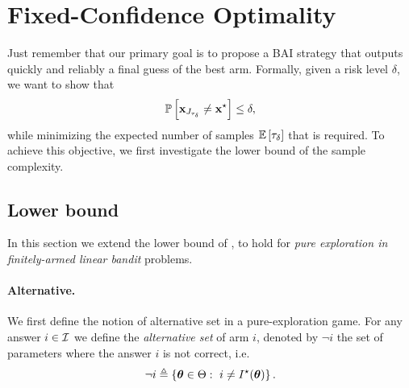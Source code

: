 \section{Fixed-Confidence Optimality}\label{sec:lgc.complexity}

Just remember that our primary goal is to propose a BAI strategy that outputs quickly and reliably a final guess of the best arm. Formally, given a risk level $\delta$, we want to show that
\[
  \mathbb{P}\left[{\bf x}_{J_{\tau_\delta}}\neq {\bf x}^\star\right] \leq \delta,
\]
while minimizing the expected number of samples $\mathbb{E}\left[\tau_\delta\right]$ that is required. To achieve this objective, we first investigate the lower bound of the sample complexity.

\subsection{Lower bound}\label{sec:lgc.complexity.lb}

In this section we extend the lower bound of \citet{garivier2016tracknstop}, to hold for \emph{pure exploration in finitely-armed linear bandit} problems.

\paragraph{Alternative.}
We first define the notion of \gls{alternative set} in a pure-exploration game. For any answer $i\in\mathcal{I}$ we define the \emph{alternative set} of arm $i$, denoted by $\neg i$ the set of parameters where the answer $i$ is not correct, i.e.
\[
    \neg i \triangleq \{{\boldsymbol \theta}\in\Theta:\ i\neq I^\star({\boldsymbol \theta})\}\,.
\]


